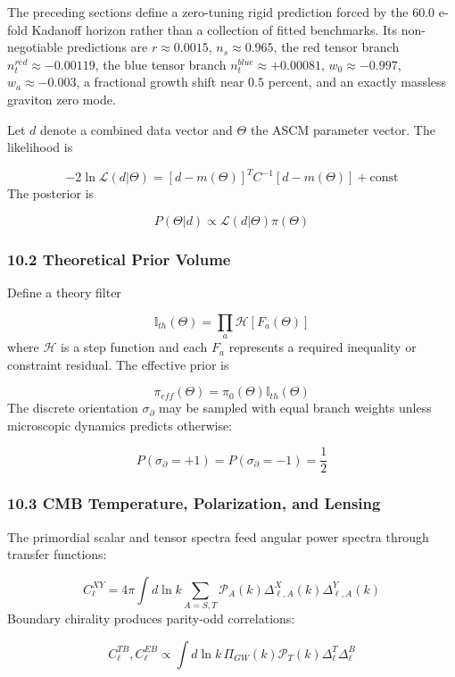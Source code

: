 \documentclass[aps,prd,onecolumn,superscriptaddress,nofootinbib,longbibliography,10pt]{revtex4-2}
\begin{document}
  The preceding sections define a zero-tuning rigid prediction forced by the 60.0 e-fold Kadanoff horizon rather than a collection of fitted benchmarks. Its non-negotiable predictions are \(r \approx 0.0015\), \(n_s \approx 0.965\), the red tensor branch \(n_t^{red} \approx -0.00119\), the blue tensor branch \(n_t^{blue} \approx +0.00081\), \(w_0 \approx -0.997\), \(w_a \approx -0.003\), a fractional growth shift near \(0.5\) percent, and an exactly massless graviton zero mode.


  Let \(d\) denote a combined data vector and \(\Theta\) the ASCM parameter vector. The likelihood is


  \[ -2\ln\mathcal{L}(d|\Theta) = [d - m(\Theta)]^T C^{-1} [d - m(\Theta)] + \text{const} \]
  The posterior is


  \[ P(\Theta|d) \propto \mathcal{L}(d|\Theta)\pi(\Theta) \]

  
\subsubsection*{10.2 Theoretical Prior Volume}

  Define a theory filter


  \[ \mathbb{I}_{th}(\Theta) = \prod_a \mathcal{H}[F_a(\Theta)] \]
  where \(\mathcal{H}\) is a step function and each \(F_a\) represents a required inequality or constraint residual. The effective prior is


  \[ \pi_{eff}(\Theta) = \pi_0(\Theta)\mathbb{I}_{th}(\Theta) \]
  The discrete orientation \(\sigma_\partial\) may be sampled with equal branch weights unless microscopic dynamics predicts otherwise:


  \[ P(\sigma_\partial = +1) = P(\sigma_\partial = -1) = \frac{1}{2} \]

  
\subsubsection*{10.3 CMB Temperature, Polarization, and Lensing}

  The primordial scalar and tensor spectra feed angular power spectra through transfer functions:


  \[ C_\ell^{XY} = 4\pi \int d\ln k \sum_{A=S,T} \mathcal{P}_A(k) \Delta_{\ell,A}^X(k)\Delta_{\ell,A}^Y(k) \]
  Boundary chirality produces parity-odd correlations:


  \[ C_\ell^{TB}, C_\ell^{EB} \propto \int d\ln k\, \Pi_{GW}(k)\mathcal{P}_T(k)\Delta_\ell^T \Delta_\ell^B \]
\end{document}
